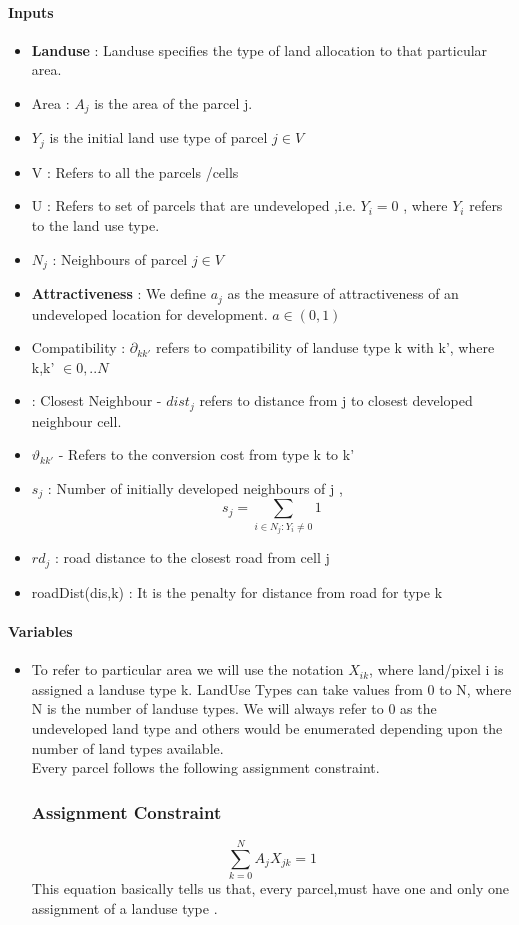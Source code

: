 \documentclass{sig-alternate}
\begin{document}
\paragraph{Inputs\\}
\begin{itemize}
\item  \textbf{Landuse }: Landuse specifies the type of land allocation to that particular area.
\item Area : $A_j$ is the area of the parcel j.
\item $Y_j$ is the initial land use type of parcel $j \in V$
\item V : Refers to all the parcels /cells
\item U : Refers to set of parcels that are undeveloped ,i.e.
$ Y_{i} = 0$ , where  $Y_{i}$ refers to the land use type. 
\item $N_j$ : Neighbours of parcel $j \in V$    
\item \textbf{Attractiveness} : We define $a_j$  as the measure of attractiveness of an undeveloped location for development. 
$ a \in (0,1)$
\item Compatibility : $\partial_{kk'}$ refers to compatibility of landuse type k with k', where k,k' $\in {0,..N}$
\item : Closest Neighbour -  $dist_j$ refers to distance from j to closest developed neighbour cell.
\item $\vartheta_{kk'} $ - Refers to the conversion cost from  type k to k'
\item $s_j$ : Number of initially developed neighbours of j , $$ s_j = \sum_{i \in N_j: Y_i \neq 0} 1$$
\item $rd_j$ : road distance to the closest road from cell  j
\item roadDist(dis,k) : It is the penalty for distance from road for type k

\end{itemize}

\paragraph{Variables\\}
\begin{itemize}
\item  To refer to particular area we will use the notation $X_{ik}$, where land/pixel i is assigned a landuse type k. LandUse Types can take values from 0 to N, where N is the number of landuse types. We will always refer to 0 as the undeveloped land type and others would be enumerated depending upon the number of land types available.\\
Every parcel follows the following assignment constraint.

\subsubsection*{Assignment Constraint}
$$\sum_{k=0}^N A_j X_{jk} =1$$
This equation basically tells us that, every parcel,must have one and only one assignment of a landuse type .
\end{itemize}
\end{document}
